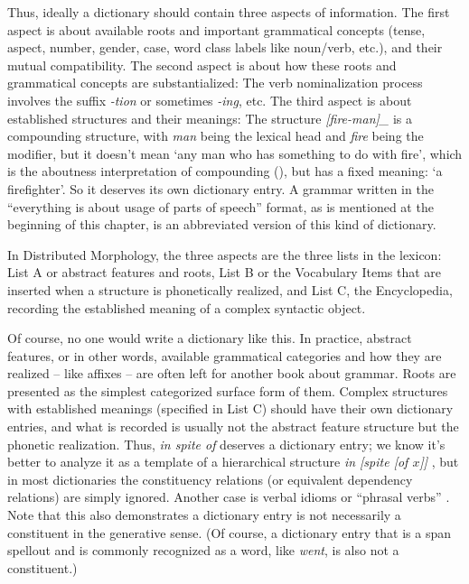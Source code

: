 \documentclass[UTF8, a4paper, oneside, scheme=plain]{ctexrep}
\newcommand*{\citepage}[1]{p.~{#1}}
\newcommand{\corpus}[1]{\emph{#1}}
\newcommand{\translate}[1]{`#1'}
\begin{document}
Thus, ideally a dictionary should contain three aspects of information.
The first aspect is about available roots and important grammatical concepts
(tense, aspect, number, gender, case, word class labels like noun/verb, etc.),
and their mutual compatibility.
The second aspect is about how these roots and grammatical concepts are substantialized:
The verb nominalization process involves the suffix \corpus{-tion} or sometimes \corpus{-ing}, etc.
The third aspect is about established structures and their meanings:
The structure \corpus{[fire-man]_{}} 
is a compounding structure,
with \corpus{man} being the lexical head and \corpus{fire} being the modifier,
but it doesn't mean \translate{any man who has something to do with fire},
which is the aboutness interpretation of compounding 
(),
but has a fixed meaning: \translate{a firefighter}.
So it deserves its own dictionary entry.
A grammar written in the ``everything is about usage of parts of speech'' format, 
as is mentioned at the beginning of this chapter,
is an abbreviated version of this kind of dictionary.

In Distributed Morphology,
the three aspects are the three lists in the lexicon:
List A or abstract features and roots,
List B or the Vocabulary Items that are inserted when a structure is phonetically realized,
and List C, the Encyclopedia, recording the established meaning of a complex syntactic object.

Of course, no one would write a dictionary like this.
In practice, abstract features,
or in other words,
available grammatical categories and how they are realized -- like affixes -- 
are often left for another book about grammar.
Roots are presented as the simplest categorized surface form of them.
Complex structures with established meanings (specified in List C) 
should have their own dictionary entries,
and what is recorded is usually not the abstract feature structure but the phonetic realization.
Thus, \corpus{in spite of} deserves a dictionary entry;
we know it's better to analyze it as a template of 
a hierarchical structure \corpus{in [spite [of $x$]]}
\citep[\citepage{620}]{cgel},
but in most dictionaries the constituency relations (or equivalent dependency relations)
are simply ignored.
Another case is verbal idioms or ``phrasal verbs'' \citep[\citepage{273}]{cgel}.
Note that this also demonstrates a dictionary entry 
is not necessarily a constituent in the generative sense.
(Of course, a dictionary entry that is a span spellout and is commonly recognized as a word, 
like \corpus{went}, is also not a constituent.)
\end{document}
